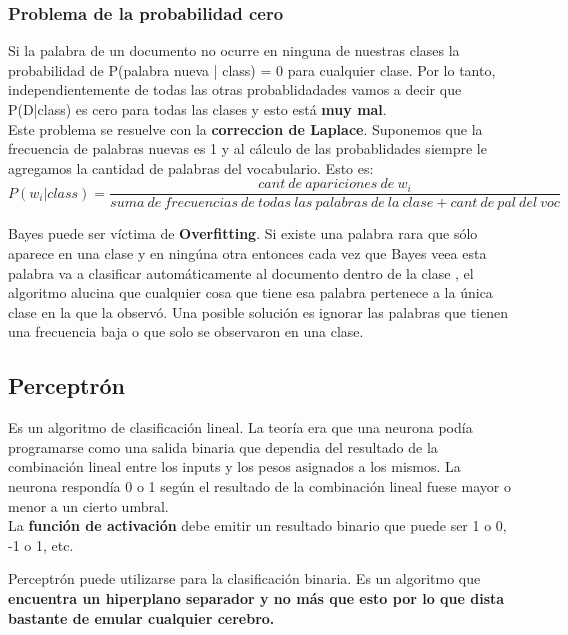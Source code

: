 \documentclass[titlepage,a4paper]{article}
\begin{document}
\subsubsection*{Problema de la probabilidad cero}
Si la palabra de un documento no ocurre en ninguna de nuestras clases la probabilidad de P(palabra nueva | class) = 0 para cualquier clase. Por lo tanto, independientemente de todas las otras probablidadades vamos a decir que P(D|class) es cero para todas las clases y esto está \textbf{muy mal}.\\

Este problema se resuelve con la \textbf{correccion de Laplace}. Suponemos que la frecuencia de palabras nuevas es 1 y al cálculo de las probablidades siempre le agregamos la cantidad de palabras del vocabulario. Esto es: $$P(w_i | class) = \frac{cant \ de \ apariciones \ de \ w_i}{suma \ de \ frecuencias \ de \ todas \ las \ palabras \ de \ la \ clase + cant \ de \ pal \ del \ voc}$$

Bayes puede ser víctima de \textbf{Overfitting}. Si existe una palabra rara que sólo aparece en una clase y en ningúna otra entonces cada vez que Bayes veea esta palabra va a clasificar automáticamente al documento dentro de la clase , el algoritmo alucina que cualquier cosa que tiene esa palabra pertenece a la única clase en la que la observó. Una posible solución es ignorar las palabras que tienen una frecuencia baja o que solo se observaron en una clase. 

\subsection*{Perceptrón}
Es un algoritmo de clasificación lineal. La teoría era que una neurona podía programarse como una salida binaria que dependia del resultado de la combinación lineal entre los inputs y los pesos asignados a los mismos. La neurona respondía 0 o 1 según el resultado de la combinación lineal fuese mayor o menor a un cierto umbral. \\

La \textbf{función de activación} debe emitir un resultado binario que puede ser 1 o 0, -1 o 1, etc.

Perceptrón puede utilizarse para la clasificación binaria. Es un algoritmo que \textbf{encuentra un hiperplano separador y no más que esto por lo que dista bastante de emular cualquier cerebro. }\\
\end{document}
